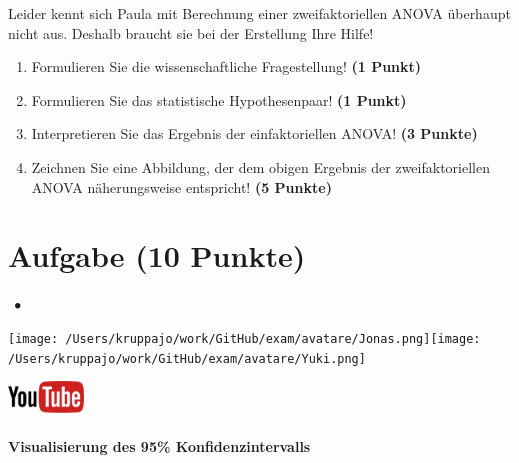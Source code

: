 \documentclass[a4paper, 9pt]{scrartcl}\usepackage[]{graphicx}\usepackage[]{xcolor}
\begin{document}
\vspace{1ex}

Leider kennt sich Paula mit Berechnung einer zweifaktoriellen ANOVA überhaupt nicht aus. Deshalb braucht sie bei der Erstellung Ihre Hilfe! 

\begin{enumerate}
  \item Formulieren Sie die wissenschaftliche Fragestellung! \textbf{(1 Punkt)}
  \item Formulieren Sie das statistische Hypothesenpaar! \textbf{(1 Punkt)}
\item Interpretieren Sie das Ergebnis der einfaktoriellen ANOVA! \textbf{(3 Punkte)} 
\item Zeichnen Sie eine Abbildung, der dem obigen Ergebnis der
  zweifaktoriellen ANOVA näherungsweise entspricht! \textbf{(5 Punkte)}
\end{enumerate}
 
\clearpage

\section{Aufgabe \hfill (10 Punkte)}


 
\ifcollection
\begin{flushright}
\tiny
\textbf{\examinhaltstart}
\exammodulestatversuch $\;\bullet$
\exammodulebiostat
\vspace{-4Ex}
\end{flushright}
\begin{minipage}[t]{0.5\textwidth}
\texttt{[image: /Users/kruppajo/work/GitHub/exam/avatare/Jonas.png]}\hspace{-4mm}\texttt{[image: /Users/kruppajo/work/GitHub/exam/avatare/Yuki.png]}
\end{minipage}
\begin{minipage}[t]{0.5\textwidth}
\hfill
\href{https://youtu.be/CN_O4fYPbhs}{\includegraphics[width = 2cm]{img/youtube}}
\end{minipage}
\fi



\ifcollection
\paragraph{Visualisierung des 95\% Konfidenzintervalls}
\fi
\end{document}
